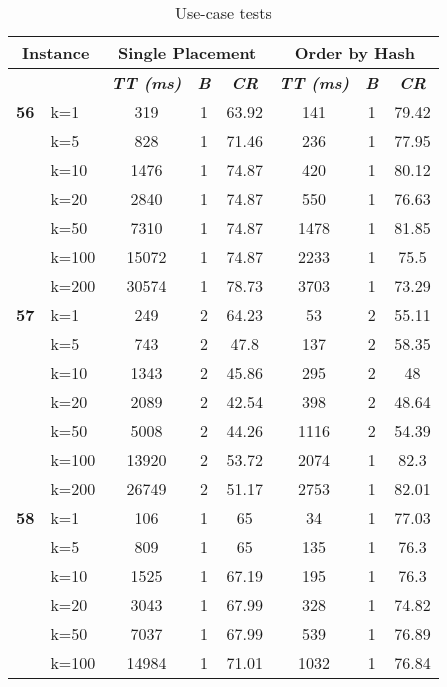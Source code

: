     \begin{table}[htbp]
    \caption{Use-case tests}
    \centering
    \begin{tabular}{|l|l|c|c|c|c|c|c|}
    
    \multicolumn{ 2}{|c|}{\textbf{Instance}} & \multicolumn{ 3}{c|}{\textbf{Single Placement}} & \multicolumn{ 3}{c|}{\textbf{Order by Hash}} \\ \hline
    \multicolumn{ 2}{|l|}{} & \textbf{\textit{TT (ms)}} & \textbf{\textit{B}} & \textbf{\textit{CR}} & \textbf{\textit{TT (ms)}} & \textbf{\textit{B}} & \textbf{\textit{CR}} \\ \hline
    \multicolumn{1}{|r|}{\textbf{56}} & k=1 & 319 & 1 & 63.92 & 141 & 1 & 79.42 \\ 
     & k=5 & 828 & 1 & 71.46 & 236 & 1 & 77.95 \\ 
     & k=10 & 1476 & 1 & 74.87 & 420 & 1 & 80.12 \\ 
     & k=20 & 2840 & 1 & 74.87 & 550 & 1 & 76.63 \\ 
     & k=50 & 7310 & 1 & 74.87 & 1478 & 1 & 81.85 \\ 
     & k=100 & 15072 & 1 & 74.87 & 2233 & 1 & 75.5 \\ 
     & k=200 & 30574 & 1 & 78.73 & 3703 & 1 & 73.29 \\ \hline
    \multicolumn{1}{|r|}{\textbf{57}} & k=1 & 249 & 2 & 64.23 & 53 & 2 & 55.11 \\ 
     & k=5 & 743 & 2 & 47.8 & 137 & 2 & 58.35 \\ 
     & k=10 & 1343 & 2 & 45.86 & 295 & 2 & 48 \\ 
     & k=20 & 2089 & 2 & 42.54 & 398 & 2 & 48.64 \\ 
     & k=50 & 5008 & 2 & 44.26 & 1116 & 2 & 54.39 \\ 
     & k=100 & 13920 & 2 & 53.72 & 2074 & 1 & 82.3 \\ 
     & k=200 & 26749 & 2 & 51.17 & 2753 & 1 & 82.01 \\ \hline
    \multicolumn{1}{|r|}{\textbf{58}} & k=1 & 106 & 1 & 65 & 34 & 1 & 77.03 \\ 
     & k=5 & 809 & 1 & 65 & 135 & 1 & 76.3 \\ 
     & k=10 & 1525 & 1 & 67.19 & 195 & 1 & 76.3 \\ 
     & k=20 & 3043 & 1 & 67.99 & 328 & 1 & 74.82 \\ 
     & k=50 & 7037 & 1 & 67.99 & 539 & 1 & 76.89 \\ 
     & k=100 & 14984 & 1 & 71.01 & 1032 & 1 & 76.84 \\ 

\end{tabular}
\end{table}
